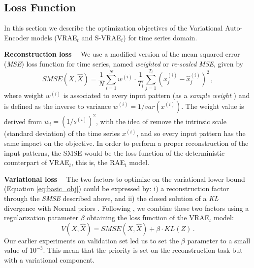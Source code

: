 \subsection{Loss Function}
In this section we describe the optimization objectives of the Variational Auto-Encoder models (VRAE$_t$ and S-VRAE$_t$) for time series domain.

\textbf{Reconstruction loss} \ \ 
We use a modified version of the mean squared error (\textit{MSE}) loss function for time series, named \textit{weighted} or \textit{re-scaled} \textit{MSE}, given by
\begin{equation}
    SMSE(X, \hat{X}) = \frac{1}{N} \sum_{i=1}^N w^{(i)} \cdot \frac{1}{T_i} \sum_{j=1}^{T_i} \left( x_j^{(i)} - \hat{x}_j^{(i)}  \right)^2 \, ,
\end{equation}
where weight $w^{(i)}$ is associated to every input pattern (as a \textit{sample weight} \citep{freund1995desicion}) and is defined as the inverse to variance $w^{(i)} = 1/var(x^{(i)})$. The weight value is derived from $w_i = \left(1/s^{(i)}\right)^2$, with the idea of remove the intrinsic scale (standard deviation) of the time series $x^{(i)}$, and so every input pattern has the same impact on the objective. In order to perform a proper reconstruction of the input patterns, the SMSE would be the loss function of the deterministic counterpart of VRAE$_t$, this is, the RAE$_t$ model.

\textbf{Variational loss} \ \ The two factors to optimize on the variational lower bound (Equation \ref{eq:basic_obj}) could be expressed by: i) a reconstruction factor through the \textit{SMSE} described above, and ii) the closed solution of a \textit{KL} divergence with Normal priors \citep{kingma2013auto}.
Following \citep{higgins2017beta}, we combine these two factors using a regularization parameter $\beta$ obtaining the loss function of the VRAE$_t$ model:
\begin{equation}
    V(X, \hat{X}) = SMSE(X, \hat{X}) + \beta \cdot KL(Z) \, .
\end{equation}
Our earlier experiments on validation set led us to set the $\beta$ parameter to a small value of $10^{-3}$. This mean that the priority is set on the reconstruction task but with a variational component.


